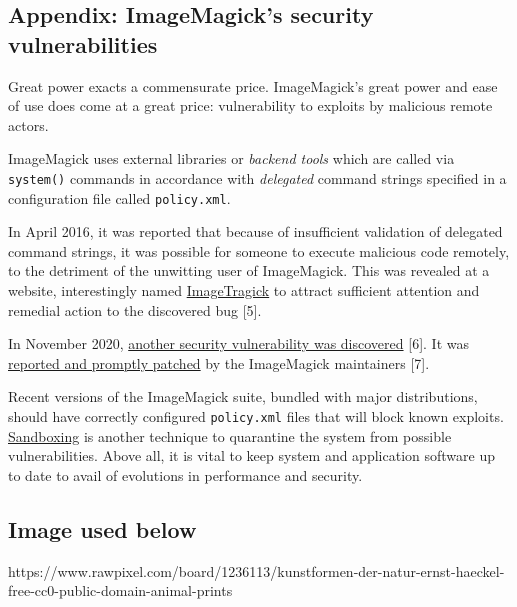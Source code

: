 \documentclass[
  11pt,
  british,
  a4paper,
]{article}
\begin{document}
\hypertarget{appendix-imagemagicks-security-vulnerabilities}{%
\subsection{Appendix: ImageMagick's security
vulnerabilities}\label{appendix-imagemagicks-security-vulnerabilities}}

Great power exacts a commensurate price. ImageMagick's great power and
ease of use does come at a great price: vulnerability to exploits by
malicious remote actors.

ImageMagick uses external libraries or \emph{backend tools} which are
called via \texttt{system()} commands in accordance with
\emph{delegated} command strings specified in a configuration file
called \texttt{policy.xml}.

In April 2016, it was reported that because of insufficient validation
of delegated command strings, it was possible for someone to execute
malicious code remotely, to the detriment of the unwitting user of
ImageMagick. This was revealed at a website, interestingly named
\href{https://imagetragick.com/}{ImageTragick} to attract sufficient
attention and remedial action to the discovered bug {[}5{]}.

In November 2020,
\href{https://portswigger.net/daily-swig/imagemagick-pdf-parsing-flaw-allowed-attacker-to-execute-shell-commands-via-maliciously-crafted-image}{another
security vulnerability was discovered} {[}6{]}. It was
\href{https://insert-script.blogspot.com/2020/11/imagemagick-shell-injection-via-pdf.html}{reported
and promptly patched} by the ImageMagick maintainers {[}7{]}.

Recent versions of the ImageMagick suite, bundled with major
distributions, should have correctly configured \texttt{policy.xml}
files that will block known exploits.
\href{https://www.techopedia.com/definition/25266/sandboxing}{Sandboxing}
is another technique to quarantine the system from possible
vulnerabilities. Above all, it is vital to keep system and application
software up to date to avail of evolutions in performance and security.

\hypertarget{image-used-below}{%
\subsection{Image used below}\label{image-used-below}}

https://www.rawpixel.com/board/1236113/kunstformen-der-natur-ernst-haeckel-free-cc0-public-domain-animal-prints
\end{document}
